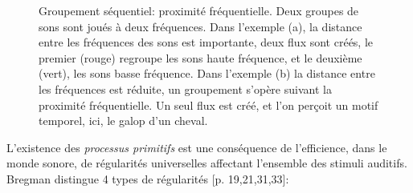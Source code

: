 \begin{figure}[t]
        \myfloatalign
        \caption[Groupement séquentiel : proximité fréquentielle.]{Groupement séquentiel: proximité fréquentielle. Deux groupes de sons sont joués à deux fréquences. Dans l'exemple (a), la distance entre les fréquences des sons est importante, deux flux sont créés, le premier (rouge) regroupe les sons haute fréquence, et le deuxième (vert), les sons basse fréquence. Dans l'exemple (b) la distance entre les fréquences est réduite, un groupement s'opère suivant la proximité fréquentielle. Un seul flux est créé, et l'on perçoit un motif temporel, ici, le galop d'un cheval.}\label{fig:galop}
\end{figure}

L'existence des \emph{processus primitifs} est une conséquence de l'efficience, dans le monde sonore, de régularités universelles affectant l'ensemble des stimuli auditifs. Bregman distingue 4 types de régularités [p. 19,21,31,33]\citep{mcadams1994penser}:

